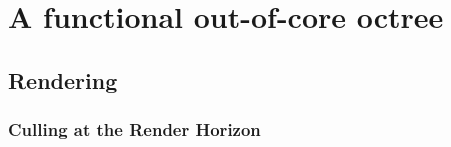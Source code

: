\chapter{A functional out-of-core octree}

\section{Rendering}
\subsection{Culling at the Render Horizon}
\label{sec:renderHorizon}






